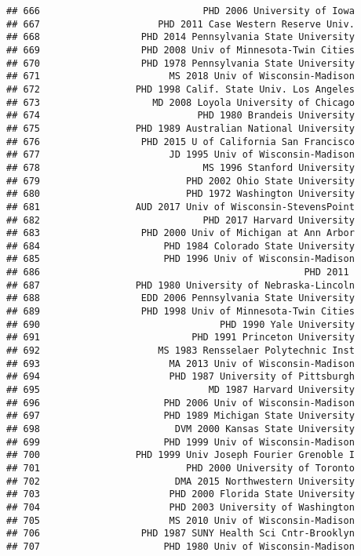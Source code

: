 \documentclass[
]{article}
\begin{document}
\begin{verbatim}
## 666                             PHD 2006 University of Iowa
## 667                     PHD 2011 Case Western Reserve Univ.
## 668                  PHD 2014 Pennsylvania State University
## 669                  PHD 2008 Univ of Minnesota-Twin Cities
## 670                  PHD 1978 Pennsylvania State University
## 671                       MS 2018 Univ of Wisconsin-Madison
## 672                 PHD 1998 Calif. State Univ. Los Angeles
## 673                    MD 2008 Loyola University of Chicago
## 674                            PHD 1980 Brandeis University
## 675                 PHD 1989 Australian National University
## 676                  PHD 2015 U of California San Francisco
## 677                       JD 1995 Univ of Wisconsin-Madison
## 678                             MS 1996 Stanford University
## 679                          PHD 2002 Ohio State University
## 680                          PHD 1972 Washington University
## 681                 AUD 2017 Univ of Wisconsin-StevensPoint
## 682                             PHD 2017 Harvard University
## 683                  PHD 2000 Univ of Michigan at Ann Arbor
## 684                      PHD 1984 Colorado State University
## 685                      PHD 1996 Univ of Wisconsin-Madison
## 686                                               PHD 2011 
## 687                 PHD 1980 University of Nebraska-Lincoln
## 688                  EDD 2006 Pennsylvania State University
## 689                  PHD 1998 Univ of Minnesota-Twin Cities
## 690                                PHD 1990 Yale University
## 691                           PHD 1991 Princeton University
## 692                     MS 1983 Rensselaer Polytechnic Inst
## 693                       MA 2013 Univ of Wisconsin-Madison
## 694                       PHD 1987 University of Pittsburgh
## 695                              MD 1987 Harvard University
## 696                      PHD 2006 Univ of Wisconsin-Madison
## 697                      PHD 1989 Michigan State University
## 698                        DVM 2000 Kansas State University
## 699                      PHD 1999 Univ of Wisconsin-Madison
## 700                 PHD 1999 Univ Joseph Fourier Grenoble I
## 701                          PHD 2000 University of Toronto
## 702                        DMA 2015 Northwestern University
## 703                       PHD 2000 Florida State University
## 704                       PHD 2003 University of Washington
## 705                       MS 2010 Univ of Wisconsin-Madison
## 706                  PHD 1987 SUNY Health Sci Cntr-Brooklyn
## 707                      PHD 1980 Univ of Wisconsin-Madison

\end{verbatim}
\end{document}
